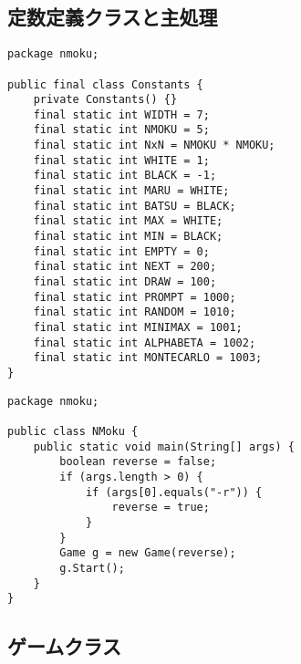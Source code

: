 \documentclass[uplatex,a4paper,11pt,oneside,openany]{jsbook}
\begin{document}
\subsection{定数定義クラスと主処理}

\begin{lstlisting}[caption=定数定義クラス：N目並べ,label=prog22]
package nmoku;

public final class Constants {
    private Constants() {}
    final static int WIDTH = 7;
    final static int NMOKU = 5;
    final static int NxN = NMOKU * NMOKU;
    final static int WHITE = 1;
    final static int BLACK = -1;
    final static int MARU = WHITE;
    final static int BATSU = BLACK;
    final static int MAX = WHITE;
    final static int MIN = BLACK;
    final static int EMPTY = 0;
    final static int NEXT = 200;
    final static int DRAW = 100;
    final static int PROMPT = 1000;
    final static int RANDOM = 1010;
    final static int MINIMAX = 1001;
    final static int ALPHABETA = 1002;
    final static int MONTECARLO = 1003;
}
\end{lstlisting}

\begin{lstlisting}[caption=主処理：N目並べ,label=prog23]
package nmoku;

public class NMoku {
    public static void main(String[] args) {
        boolean reverse = false;
        if (args.length > 0) {
            if (args[0].equals("-r")) {
                reverse = true;
            }
        }
        Game g = new Game(reverse);
        g.Start();
    }
}
\end{lstlisting}

\subsection{ゲームクラス}
\end{document}
